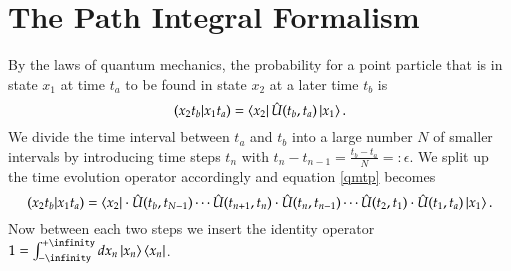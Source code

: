 \section{The Path Integral Formalism}

By the laws of quantum mechanics, the probability for a point particle that is in state $x_1$ at time $t_a$ to be found in state $x_2$ at a later time $t_b$ is
\begin{equation} \label{qmtp}
  (x_2 t_b | x_1 t_a) = \bra{x_2}\hat{U}(t_b,t_a)\ket{x_1}.
\end{equation}
We divide the time interval between $t_a$ and $t_b$ into a large number $N$ of smaller intervals by introducing time steps $t_n$ with $t_n -t_{n-1} = \frac{t_b - t_a}{N} =:\epsilon$. We split up the time evolution operator accordingly and equation \ref{qmtp} becomes
\begin{equation} \label{qmtpn}
  (x_2 t_b | x_1 t_a) = \bra{x_2}\cdot\hat{U}(t_b,t_{N-1}) \cdots \hat{U}(t_{n+1},t_n)\cdot\hat{U}(t_n,t_{n-1}) \cdots \hat{U}(t_2,t_1)\cdot\hat{U}(t_1,t_a)\ket{x_1}.
\end{equation}
Now between each two steps we insert the identity operator $1 = \int_{-\infinity}^{+\infinity} dx_n \ket{x_n}\bra{x_n}$.
